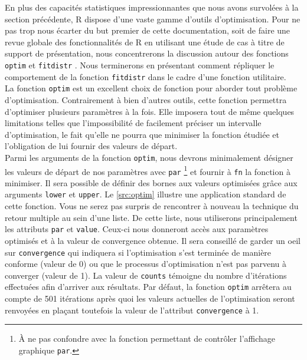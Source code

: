 En plus des capacités statistiques impressionnantes que nous avons survolées à la section précédente, R dispose d'une vaste gamme d'outils d'optimisation. Pour ne pas trop nous écarter du but premier de cette documentation, soit de faire une revue globale des fonctionnalités de R en utilisant une étude de cas à titre de support de présentation, nous concentrerons la discussion autour des fonctions \texttt{optim} \cite{Rfunction:optim} et \texttt{fitdistr} \cite{Rfunction:fitdistr}. Nous terminerons en présentant comment répliquer le comportement de la fonction \texttt{fitdistr} dans le cadre d'une fonction utilitaire. \\

La fonction \texttt{optim} est un excellent choix de fonction pour aborder tout problème d'optimisation. Contrairement à bien d'autres outils, cette fonction permettra d'optimiser plusieurs paramètres à la fois. Elle imposera tout de même quelques limitations telles que l'impossibilité de facilement préciser un intervalle d'optimisation, le fait qu'elle ne pourra que minimiser la fonction étudiée et l'obligation de lui fournir des valeurs de départ. \cite{optim} \\

Parmi les arguments de la fonction \texttt{optim}, nous devrons minimalement désigner les valeurs de départ de nos paramètres avec \texttt{par} \footnote{À ne pas confondre avec la fonction permettant de contrôler l'affichage graphique \texttt{par}.} et fournir à \texttt{fn} la fonction à minimiser. Il sera possible de définir des bornes aux valeurs optimisées grâce aux arguments \texttt{lower} et \texttt{upper}. Le \autoref{src:optim} illustre une application standard de cette fonction. Vous ne serez pas surpris de rencontrer à nouveau la technique du retour multiple au sein d'une liste. De cette liste, nous utiliserons principalement les attributs \texttt{par} et \texttt{value}. Ceux-ci nous donneront accès aux paramètres optimisés et à la valeur de convergence obtenue. Il sera conseillé de garder un oeil sur \texttt{convergence} qui indiquera si l'optimisation s'est terminée de manière conforme (valeur de 0) ou que le processus d'optimisation  n’est pas parvenu à converger (valeur de 1). La valeur de \texttt{counts} témoigne du nombre d'itérations effectuées afin d'arriver aux résultats. Par défaut, la fonction \texttt{optim} arrêtera au compte de 501 itérations après quoi les valeurs actuelles de l'optimisation seront renvoyées en plaçant toutefois la valeur de l'attribut \texttt{convergence} à 1. \\

